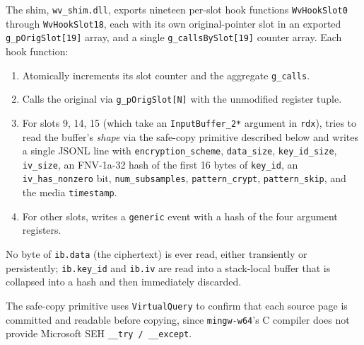 \documentclass[11pt,letterpaper]{article}
\begin{document}
The shim, \texttt{wv\_shim.dll}, exports nineteen per-slot hook
functions \texttt{WvHookSlot0} through \texttt{WvHookSlot18}, each
with its own original-pointer slot in an exported
\texttt{g\_pOrigSlot[19]} array, and a single
\texttt{g\_callsBySlot[19]} counter array.  Each hook function:

\begin{enumerate}[itemsep=2pt,topsep=2pt]
  \item Atomically increments its slot counter and the aggregate
        \texttt{g\_calls}.
  \item Calls the original via \texttt{g\_pOrigSlot[N]} with the
        unmodified register tuple.
  \item For slots 9, 14, 15 (which take an \texttt{InputBuffer\_2*}
        argument in \texttt{rdx}), tries to read the buffer's
        \emph{shape} via the safe-copy primitive described below
        and writes a single JSONL line with
        \texttt{encryption\_scheme}, \texttt{data\_size},
        \texttt{key\_id\_size}, \texttt{iv\_size}, an FNV-1a-32 hash
        of the first 16 bytes of \texttt{key\_id}, an
        \texttt{iv\_has\_nonzero} bit, \texttt{num\_subsamples},
        \texttt{pattern\_crypt}, \texttt{pattern\_skip}, and the
        media \texttt{timestamp}.
  \item For other slots, writes a \texttt{generic} event with a hash
        of the four argument registers.
\end{enumerate}

\noindent No byte of \texttt{ib.data} (the ciphertext) is ever read,
either transiently or persistently; \texttt{ib.key\_id} and
\texttt{ib.iv} are read into a stack-local buffer that is collapsed
into a hash and then immediately discarded.

The safe-copy primitive uses \texttt{VirtualQuery} to confirm that
each source page is committed and readable before copying, since
\texttt{mingw-w64}'s C compiler does not provide Microsoft
SEH \texttt{\_\_try / \_\_except}.
\end{document}
